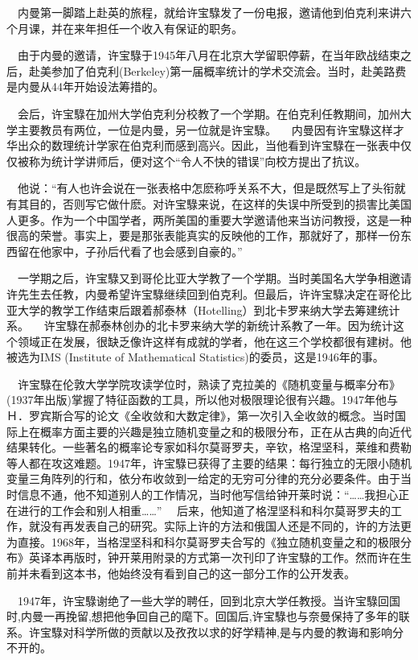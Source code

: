 \documentclass[a4paper,AutoFakeBold,oneside,12pt]{article}
\begin{document}
$\quad$内曼第一脚踏上赴英的旅程，就给许宝騄发了一份电报，邀请他到伯克利来讲六个月课，并在来年担任一个收入有保证的职务。

$\quad$由于内曼的邀请，许宝騄于1945年八月在北京大学留职停薪，在当年欧战结束之后，赴美参加了伯克利(Berkeley)第一届概率统计的学术交流会。当时，赴美路费是内曼从44年开始设法筹措的。

$\quad$会后，许宝騄在加州大学伯克利分校教了一个学期。在伯克利任教期间，加州大学主要教员有两位，一位是内曼，另一位就是许宝騄。
	$\quad$内曼因有许宝騄这样才华出众的数理统计学家在伯克利而感到高兴。因此，当他看到许宝騄在一张表中仅仅被称为统计学讲师后，便对这个“令人不快的错误”向校方提出了抗议。

$\quad$他说：“有人也许会说在一张表格中怎麽称呼关系不大，但是既然写上了头衔就有其目的，否则写它做什麽。对许宝騄来说，在这样的失误中所受到的损害比美国人更多。作为一个中国学者，两所美国的重要大学邀请他来当访问教授，这是一种很高的荣誉。事实上，要是那张表能真实的反映他的工作，那就好了，那样一份东西留在他家中，子孙后代看了也会感到自豪的。”

$\quad$一学期之后，许宝騄又到哥伦比亚大学教了一个学期。当时美国名大学争相邀请许先生去任教，内曼希望许宝騄继续回到伯克利。但最后，许许宝騄决定在哥伦比亚大学的教学工作结束后跟着郝泰林（Hotelling）到北卡罗来纳大学去筹建统计系。
	$\quad$许宝騄在郝泰林创办的北卡罗来纳大学的新统计系教了一年。因为统计这个领域正在发展，很缺乏像许这样有成就的学者，他在这三个学校都很有建树。他被选为IMS (Institute of Mathematical Statistics)的委员，这是1946年的事。

$\quad$许宝騄在伦敦大学学院攻读学位时，熟读了克拉美的《随机变量与概率分布》(1937年出版)掌握了特征函数的工具，所以他对极限理论很有兴趣。1947年他与Ｈ．罗宾斯合写的论文《全收敛和大数定律》，第一次引入全收敛的概念。当时国际上在概率方面主要的兴趣是独立随机变量之和的极限分布，正在从古典的向近代结果转化。一些著名的概率论专家如科尔莫哥罗夫，辛钦，格涅坚科，莱维和费勒等人都在攻这难题。1947年，许宝騄已获得了主要的结果：每行独立的无限小随机变量三角阵列的行和，依分布收敛到一给定的无穷可分律的充分必要条件。由于当时信息不通，他不知道别人的工作情况，当时他写信给钟开莱时说：“……我担心正在进行的工作会和别人相重……”
	$\quad$后来，他知道了格涅坚科和科尔莫哥罗夫的工作，就没有再发表自己的研究。实际上许的方法和俄国人还是不同的，许的方法更为直接。1968年，当格涅坚科和科尔莫哥罗夫合写的《独立随机变量之和的极限分布》英译本再版时，钟开莱用附录的方式第一次刊印了许宝騄的工作。然而许在生前并未看到这本书，他始终没有看到自己的这一部分工作的公开发表。

$\quad$1947年，许宝騄谢绝了一些大学的聘任，回到北京大学任教授。当许宝騄回国时,内曼一再挽留,想把他争回自己的麾下。回国后,许宝騄也与奈曼保持了多年的联系。许宝騄对科学所做的贡献以及孜孜以求的好学精神,是与内曼的教诲和影响分不开的。
\end{document}
